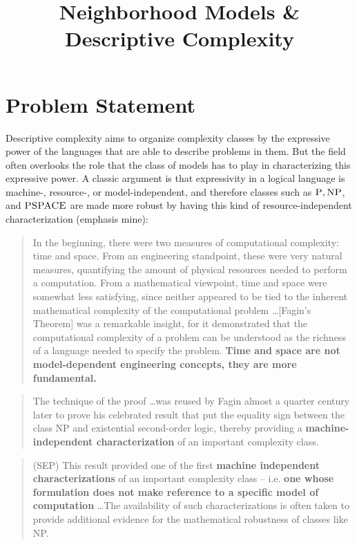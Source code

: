 \documentclass[letterpaper]{article}
\title{Neighborhood Models \& Descriptive Complexity}
\begin{document}
\maketitle

\section*{Problem Statement}
Descriptive complexity aims to organize complexity classes by the expressive power of the languages that are able to describe problems in them.  But the field often overlooks the role that the class of models has to play in characterizing this expressive power.  A classic argument is that expressivity in a logical language is machine-, resource-, or model-independent, and therefore classes such as $\mbox{\sc P}, \mbox{\sc NP}$, and $\mbox{\sc PSPACE}$ are made more robust by having this kind of resource-independent characterization (emphasis mine):

\begin{quote}{}
    In the beginning, there were two measures of computational complexity: time and space. From an engineering standpoint, these were very natural measures, quantifying the amount of physical resources needed to perform a computation. From a mathematical viewpoint, time and space were somewhat less satisfying, since neither appeared to be tied to the inherent mathematical complexity of the computational problem \ldots [Fagin's Theorem] was a remarkable insight, for it demonstrated that the computational complexity of a problem can be understood as the richness of a language needed to specify the problem. \textbf{Time and space are not model-dependent engineering concepts, they are more fundamental.}
\end{quote}

\begin{quote}{}
    The technique of the proof \ldots was reused by Fagin almost a quarter century later to prove his celebrated result that put the equality sign between the class NP and existential second-order logic, thereby providing a \textbf{machine-independent characterization} of an important complexity class.
\end{quote}


\begin{quote}{ (SEP)}
    This result provided one of the first \textbf{machine independent characterizations} of an important complexity class – i.e. \textbf{one whose formulation does not make reference to a specific model of computation} \ldots The availability of such characterizations is often taken to provide additional evidence for the mathematical robustness of classes like NP.
\end{quote}
\end{document}
